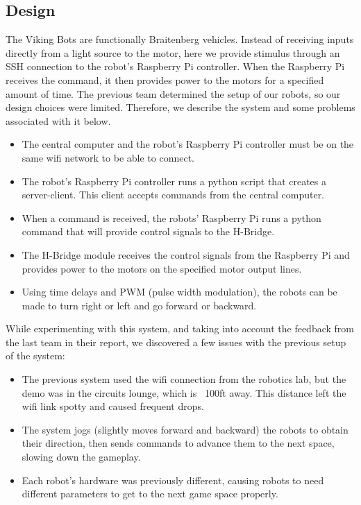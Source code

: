 \documentclass[a4paper,12pt]{article}
\begin{document}
\subsection{Design}
	The Viking Bots are functionally  Braitenberg vehicles. Instead of receiving inputs directly from a light source to the motor, here we provide stimulus through an SSH connection to the robot’s Raspberry Pi controller. When the Raspberry Pi receives the command, it then provides power to the motors for a specified amount of time. The previous team determined the setup of our robots, so our design choices were limited. Therefore, we describe the system and some problems associated with it below. 
	
	\begin{itemize}
		\item The central computer and the robot’s Raspberry Pi controller must be on the same wifi network to be able to connect.
		\item The robot's Raspberry Pi controller runs a python script that creates a server-client. This client accepts commands from the central computer.
		\item When a command is received, the robots' Raspberry Pi runs a python command that will provide control signals to the H-Bridge.
		\item The H-Bridge module receives the control signals from the Raspberry Pi and provides power to the motors on the specified motor output lines.
		\item Using time delays and PWM (pulse width modulation), the robots can be made to turn right or left and go forward or backward.

	\end{itemize}
		
While experimenting with this system, and taking into account the feedback from the last team in their report, we discovered a few issues with the previous setup of the system:

	\begin{itemize}
		\item The previous system used the wifi connection from the robotics lab, but the demo was in the circuits lounge, which is ~100ft away. This distance left the wifi link spotty and caused frequent drops.
		\item The system jogs (slightly moves forward and backward) the robots to obtain their direction, then sends commands to advance them to the next space, slowing down the gameplay.
		\item Each robot's hardware was previously different, causing robots to need different parameters to get to the next game space properly.
	\end{itemize}
\end{document}
